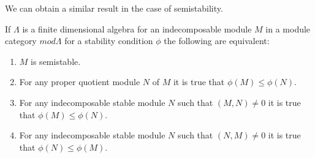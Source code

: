 \indent We can obtain a similar result in the case of semistability.\\
\begin{theorem}
If $\Lambda$ is a finite dimensional algebra for an indecomposable module $M$ in a module category $mod \Lambda$ for a stability condition $\phi$ the following are equivalent:
\begin{enumerate}
\item $M$ is semistable.
\item For any proper quotient module $N$ of $M$ it is true that $\phi(M)\leq\phi(N)$.
\item For any indecomposable stable module $N$ such that $(M,N)\neq 0$ it is true that $\phi(M)\leq\phi(N)$.
\item For any indecomposable stable module $N$ such that $(N,M)\neq 0$ it is true that $\phi(N)\leq\phi(M)$.
\end{enumerate}
\end{theorem}
